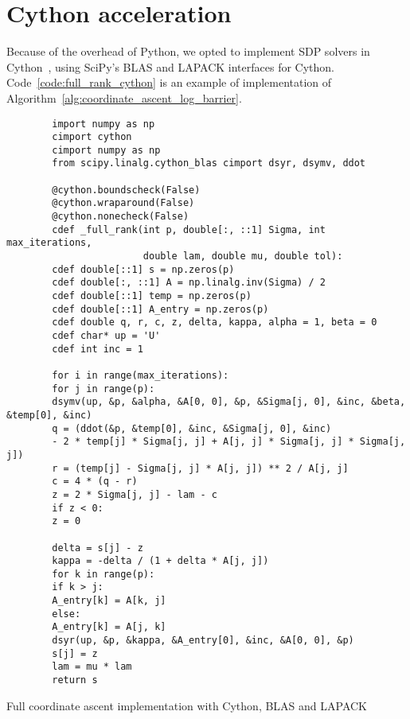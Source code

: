 \chapter{Cython acceleration}\label{ch:cython_acceleration}
Because of the overhead of Python, we opted to implement SDP solvers in Cython~\cite{cython},
using SciPy's BLAS and LAPACK interfaces for Cython.
Code~\ref{code:full_rank_cython} is an example of implementation of Algorithm~\ref{alg:coordinate_ascent_log_barrier}.
\begin{calgorithm}
    \begin{verbatim}
        import numpy as np
        cimport cython
        cimport numpy as np
        from scipy.linalg.cython_blas cimport dsyr, dsymv, ddot

        @cython.boundscheck(False)
        @cython.wraparound(False)
        @cython.nonecheck(False)
        cdef _full_rank(int p, double[:, ::1] Sigma, int max_iterations,
                        double lam, double mu, double tol):
        cdef double[::1] s = np.zeros(p)
        cdef double[:, ::1] A = np.linalg.inv(Sigma) / 2
        cdef double[::1] temp = np.zeros(p)
        cdef double[::1] A_entry = np.zeros(p)
        cdef double q, r, c, z, delta, kappa, alpha = 1, beta = 0
        cdef char* up = 'U'
        cdef int inc = 1

        for i in range(max_iterations):
        for j in range(p):
        dsymv(up, &p, &alpha, &A[0, 0], &p, &Sigma[j, 0], &inc, &beta, &temp[0], &inc)
        q = (ddot(&p, &temp[0], &inc, &Sigma[j, 0], &inc)
        - 2 * temp[j] * Sigma[j, j] + A[j, j] * Sigma[j, j] * Sigma[j, j])
        r = (temp[j] - Sigma[j, j] * A[j, j]) ** 2 / A[j, j]
        c = 4 * (q - r)
        z = 2 * Sigma[j, j] - lam - c
        if z < 0:
        z = 0

        delta = s[j] - z
        kappa = -delta / (1 + delta * A[j, j])
        for k in range(p):
        if k > j:
        A_entry[k] = A[k, j]
        else:
        A_entry[k] = A[j, k]
        dsyr(up, &p, &kappa, &A_entry[0], &inc, &A[0, 0], &p)
        s[j] = z
        lam = mu * lam
        return s
    \end{verbatim}
    \caption{
        Full coordinate ascent implementation with Cython, BLAS and LAPACK
    }\label{code:full_rank_cython}
\end{calgorithm}
